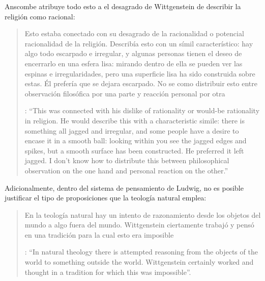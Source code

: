Anscombe atribuye todo esto a el desagrado de Wittgenstein de describir la religión como racional: \blockquote[{\Cite[122]{anscombe1981parmenides:qli}}: \enquote{This was connected with his dislike of rationality or would-be rationality in religion. He would describe this with a characteristic simile: there is something all jagged and irregular, and some people have a desire to encase it in a smooth ball: looking within you see the jagged edges and spikes, but a smooth surface has been constructed. He preferred it left jagged. I don't know how to distribute this between philosophical observation on the one hand and personal reaction on the other.}]{Esto estaba conectado con su desagrado de la racionalidad o potencial racionalidad de la religión. Describía esto con un símil característico: hay algo todo escarpado e irregular, y algunas personas tienen el deseo de encerrarlo en una esfera lisa: mirando dentro de ella se pueden ver las espinas e irregularidades, pero una superficie lisa ha sido construida sobre estas. Él prefería que se dejara escarpado. No se como distribuir esto entre observación filosófica por una parte y reacción personal por otra}. Adicionalmente, dentro del sistema de pensamiento de Ludwig, no es posible justificar el tipo de proposiciones que la teología natural emplea: \blockquote[{\Cite[123]{anscombe1981parmenides:qli}}: \enquote{In natural theology there is attempted reasoning from the objects of the world to something outside the world. Wittgenstein certainly worked and thought in a tradition for which this was impossible}.]{En la teología natural hay un intento de razonamiento desde los objetos del mundo a algo fuera del mundo. Wittgenstein ciertamente trabajó y pensó en una tradición para la cual esto era imposible}.

